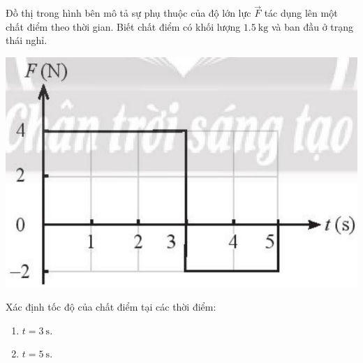 \begin{ex}
	Đồ thị trong hình bên mô tả sự phụ thuộc của độ lớn lực $\vec{F}$ tác dụng lên một chất điểm theo thời gian. Biết chất điểm có khối lượng $\SI{1.5}{\kilogram}$ và ban đầu ở trạng thái nghỉ. 
	\begin{center}
		\includegraphics[scale=0.5]{../figs/VN10-2023-PH-TP029-P-1}
	\end{center}
	Xác định tốc độ của chất điểm tại các thời điểm:
	\begin{enumerate}[label=\alph*)]
		\item $t=\SI{3}{\second}$.
		\item $t=\SI{5}{\second}$.
	\end{enumerate}
\end{ex}
